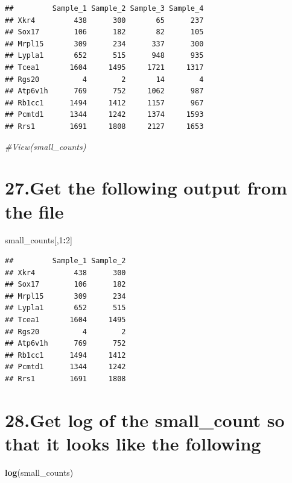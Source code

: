\documentclass[]{article}
\newenvironment{Shaded}{\begin{snugshade}}{\end{snugshade}}
\newcommand{\CommentTok}[1]{\textcolor[rgb]{0.56,0.35,0.01}{\textit{#1}}}
\newcommand{\DecValTok}[1]{\textcolor[rgb]{0.00,0.00,0.81}{#1}}
\newcommand{\KeywordTok}[1]{\textcolor[rgb]{0.13,0.29,0.53}{\textbf{#1}}}
\newcommand{\NormalTok}[1]{#1}
\newcommand{\OperatorTok}[1]{\textcolor[rgb]{0.81,0.36,0.00}{\textbf{#1}}}
\begin{document}
\begin{verbatim}
##         Sample_1 Sample_2 Sample_3 Sample_4
## Xkr4         438      300       65      237
## Sox17        106      182       82      105
## Mrpl15       309      234      337      300
## Lypla1       652      515      948      935
## Tcea1       1604     1495     1721     1317
## Rgs20          4        2       14        4
## Atp6v1h      769      752     1062      987
## Rb1cc1      1494     1412     1157      967
## Pcmtd1      1344     1242     1374     1593
## Rrs1        1691     1808     2127     1653
\end{verbatim}

\begin{Shaded}
\begin{Highlighting}[]
\CommentTok{#View(small_counts)}
\end{Highlighting}
\end{Shaded}

\hypertarget{get-the-following-output-from-the-file}{%
\section{27.Get the following output from the
file}\label{get-the-following-output-from-the-file}}

\begin{Shaded}
\begin{Highlighting}[]
\NormalTok{small_counts[,}\DecValTok{1}\OperatorTok{:}\DecValTok{2}\NormalTok{]}
\end{Highlighting}
\end{Shaded}

\begin{verbatim}
##         Sample_1 Sample_2
## Xkr4         438      300
## Sox17        106      182
## Mrpl15       309      234
## Lypla1       652      515
## Tcea1       1604     1495
## Rgs20          4        2
## Atp6v1h      769      752
## Rb1cc1      1494     1412
## Pcmtd1      1344     1242
## Rrs1        1691     1808
\end{verbatim}

\hypertarget{get-log-of-the-small_count-so-that-it-looks-like-the-following}{%
\section{28.Get log of the small\_count so that it looks like the
following}\label{get-log-of-the-small_count-so-that-it-looks-like-the-following}}

\begin{Shaded}
\begin{Highlighting}[]
\KeywordTok{log}\NormalTok{(small_counts)}
\end{Highlighting}
\end{Shaded}
\end{document}
